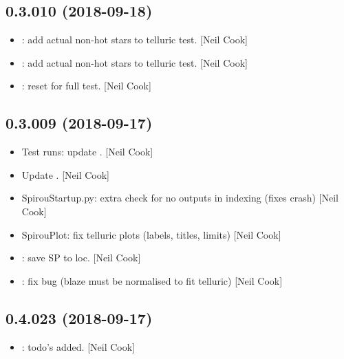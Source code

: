\documentclass[a4paper,10pt,english]{report}
\begin{document}
\subsection{0.3.010 (2018-09-18)}
\label{\detokenize{misc/changelog:id321}}\begin{itemize}
\item {} 
: add actual non-hot stars to telluric test. {[}Neil Cook{]}

\item {} 
: add actual non-hot stars to telluric test. {[}Neil Cook{]}

\item {} 
: reset for full test. {[}Neil Cook{]}

\end{itemize}


\subsection{0.3.009 (2018-09-17)}
\label{\detokenize{misc/changelog:id322}}\begin{itemize}
\item {} 
Test runs: update . {[}Neil Cook{]}

\item {} 
Update . {[}Neil Cook{]}

\item {} 
SpirouStartup.py: extra check for no outputs in indexing (fixes crash)
{[}Neil Cook{]}

\item {} 
SpirouPlot: fix telluric plots (labels, titles, limits) {[}Neil Cook{]}

\item {} 
: save SP to loc. {[}Neil Cook{]}

\item {} 
: fix bug (blaze must be normalised to fit telluric)
{[}Neil Cook{]}

\end{itemize}


\subsection{0.4.023 (2018-09-17)}
\label{\detokenize{misc/changelog:id323}}\begin{itemize}
\item {} 
: todo’s added. {[}Neil Cook{]}

\end{itemize}
\end{document}

